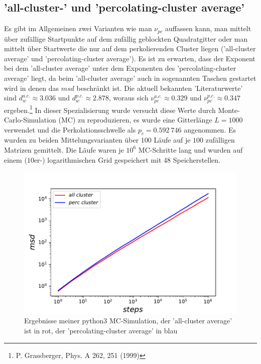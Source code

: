\documentclass[a4paper, 12pt]{scrartcl}
\begin{document}
\subsection{'all-cluster-' und 'percolating-cluster average'}

Es gibt im Allgemeinen zwei Varianten wie man $\nu_{pc}$ auffassen kann, man mittelt über zufällige Startpunkte auf dem zufällig geblockten Quadratgitter oder man mittelt über Startwerte die nur auf dem perkolierenden Cluster liegen ('all-cluster average' und 'percolating-cluster average'). Es ist zu erwarten, dass der Exponent bei dem 'all-cluster average' unter dem Exponenten des 'percolating-cluster average' liegt, da beim 'all-cluster average' auch in sogenannten Taschen gestartet wird in denen das $msd$ beschränkt ist. Die aktuell bekannten 'Literaturwerte' sind $d_w^{a.c.} \approx 3.036$ und $d_w^{p.c.} \approx 2.878$, woraus sich $\nu_{pc}^{a.c.} \approx 0.329$ und $\nu_{pc}^{p.c.} \approx 0.347$ ergeben.\footnote{P. Grassberger, Phys. A 262, 251 (1999)} In dieser Spezialisierung wurde versucht diese Werte durch Monte-Carlo-Simulation (MC) zu reproduzieren, es wurde eine Gitterlänge $L=1000$ verwendet und die Perkolationsschwelle als $p_c = 0.592\ 746$ angenommen. Es wurden zu beiden Mittelungsvarianten über $100$ Läufe auf je $100$ zufälligen Matrizen gemittelt. Die Läufe waren je $10^6$ MC-Schritte lang und wurden auf einem ($10$er-) logarithmischen Grid gespeichert mit 48 Speicherstellen. 
\begin{figure}[h!]
\centering
\includegraphics[scale=0.9]{acpc_fig.pdf}
\caption{Ergebnisse meiner python3 MC-Simulation, der 'all-cluster average' ist in rot, der 'percolating-cluster average' in blau}
\end{figure}
\end{document}
